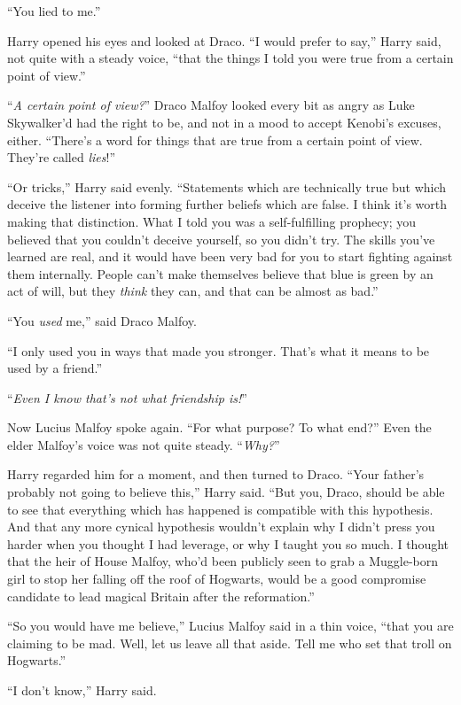 “You lied to me.”

Harry opened his eyes and looked at Draco. “I would prefer to say,” Harry said, not quite with a steady voice, “that the things I told you were true from a certain point of view.”

“\emph{A certain point of view?}” Draco Malfoy looked every bit as angry as Luke Skywalker’d had the right to be, and not in a mood to accept Kenobi’s excuses, either. “There’s a word for things that are true from a certain point of view. They’re called \emph{lies}!”

“Or tricks,” Harry said evenly. “Statements which are technically true but which deceive the listener into forming further beliefs which are false. I think it’s worth making that distinction. What I told you was a self-fulfilling prophecy; you believed that you couldn’t deceive yourself, so you didn’t try. The skills you’ve learned are real, and it would have been very bad for you to start fighting against them internally. People can’t make themselves believe that blue is green by an act of will, but they \emph{think} they can, and that can be almost as bad.”

“You \emph{used} me,” said Draco Malfoy.

“I only used you in ways that made you stronger. That’s what it means to be used by a friend.”

“\emph{Even I know that’s not what friendship is!}”

Now Lucius Malfoy spoke again. “For what purpose? To what end?” Even the elder Malfoy’s voice was not quite steady. “\emph{Why?}”

Harry regarded him for a moment, and then turned to Draco. “Your father’s probably not going to believe this,” Harry said. “But you, Draco, should be able to see that everything which has happened is compatible with this hypothesis. And that any more cynical hypothesis wouldn’t explain why I didn’t press you harder when you thought I had leverage, or why I taught you so much. I thought that the heir of House Malfoy, who’d been publicly seen to grab a Muggle-born girl to stop her falling off the roof of Hogwarts, would be a good compromise candidate to lead magical Britain after the reformation.”

“So you would have me believe,” Lucius Malfoy said in a thin voice, “that you are claiming to be mad. Well, let us leave all that aside. Tell me who set that troll on Hogwarts.”

“I don’t know,” Harry said.

